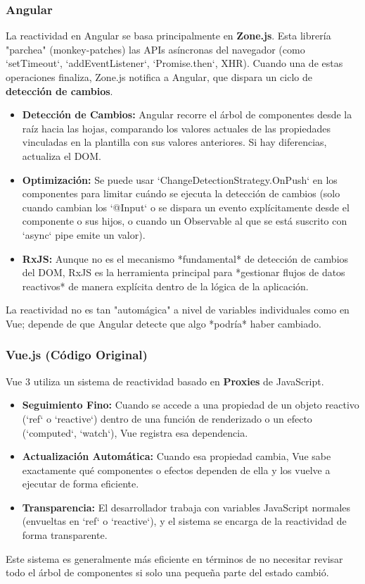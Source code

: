 \documentclass[11pt, a4paper]{article}
\begin{document}
\subsubsection{Angular}
La reactividad en Angular se basa principalmente en \textbf{Zone.js}. Esta librería "parchea" (monkey-patches) las APIs asíncronas del navegador (como `setTimeout`, `addEventListener`, `Promise.then`, XHR). Cuando una de estas operaciones finaliza, Zone.js notifica a Angular, que dispara un ciclo de \textbf{detección de cambios}.
\begin{itemize}
    \item \textbf{Detección de Cambios:} Angular recorre el árbol de componentes desde la raíz hacia las hojas, comparando los valores actuales de las propiedades vinculadas en la plantilla con sus valores anteriores. Si hay diferencias, actualiza el DOM.
    \item \textbf{Optimización:} Se puede usar `ChangeDetectionStrategy.OnPush` en los componentes para limitar cuándo se ejecuta la detección de cambios (solo cuando cambian los `@Input` o se dispara un evento explícitamente desde el componente o sus hijos, o cuando un Observable al que se está suscrito con `async` pipe emite un valor).
    \item \textbf{RxJS:} Aunque no es el mecanismo *fundamental* de detección de cambios del DOM, RxJS es la herramienta principal para *gestionar flujos de datos reactivos* de manera explícita dentro de la lógica de la aplicación.
\end{itemize}
La reactividad no es tan "automágica" a nivel de variables individuales como en Vue; depende de que Angular detecte que algo *podría* haber cambiado.

\subsubsection{Vue.js (Código Original)}
Vue 3 utiliza un sistema de reactividad basado en \textbf{Proxies} de JavaScript.
\begin{itemize}
    \item \textbf{Seguimiento Fino:} Cuando se accede a una propiedad de un objeto reactivo (`ref` o `reactive`) dentro de una función de renderizado o un efecto (`computed`, `watch`), Vue registra esa dependencia.
    \item \textbf{Actualización Automática:} Cuando esa propiedad cambia, Vue sabe exactamente qué componentes o efectos dependen de ella y los vuelve a ejecutar de forma eficiente.
    \item \textbf{Transparencia:} El desarrollador trabaja con variables JavaScript normales (envueltas en `ref` o `reactive`), y el sistema se encarga de la reactividad de forma transparente.
\end{itemize}
Este sistema es generalmente más eficiente en términos de no necesitar revisar todo el árbol de componentes si solo una pequeña parte del estado cambió.
\end{document}
